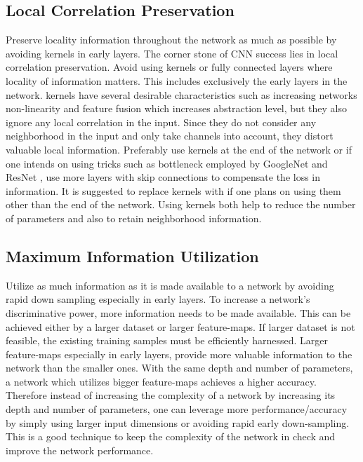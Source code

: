 \documentclass{article} \usepackage{lets_keepit_simple,times}
\begin{document}
\subsection{Local Correlation Preservation}
Preserve locality information throughout the network as much as possible by avoiding  kernels in early layers. The corner stone of CNN success lies in local correlation preservation. Avoid using  kernels or fully connected layers where locality of information matters. This includes exclusively the early layers in the network.  kernels have several desirable characteristics such as increasing networks non-linearity and feature fusion \cite{Lin_NIN_2013} which increases abstraction level, but they also ignore any local correlation in the input. Since they do not consider any neighborhood in the input and only take channels into account, they distort valuable local information. Preferably use  kernels at the end of the network or if one intends on using tricks such as bottleneck employed by GoogleNet \cite{Szegedy_googlenet_2015} and ResNet \cite{He_ResNet_2015}, use more layers with skip connections to compensate the loss in information. It is suggested to replace  kernels with  if one plans on using them other than the end of the network. Using  kernels both help to reduce the number of parameters and also to retain neighborhood information. 
\subsection{Maximum Information Utilization}
Utilize as much information as it is made available to a network by avoiding rapid down sampling especially in early layers. To increase a network's discriminative power, more information needs to be made available. This can be achieved either by a larger dataset or larger feature-maps. If larger dataset is not feasible, the existing training samples must be efficiently harnessed. Larger feature-maps especially in early layers, provide more valuable information to the network than the smaller ones. With the same depth and number of parameters, a network which utilizes bigger feature-maps achieves a higher accuracy. Therefore instead of increasing the complexity of a network by increasing its depth and number of parameters, one can leverage more performance/accuracy by simply using larger input dimensions or avoiding rapid early down-sampling. This is a good technique to keep the complexity of the network in check and improve the network performance. 
\end{document}
